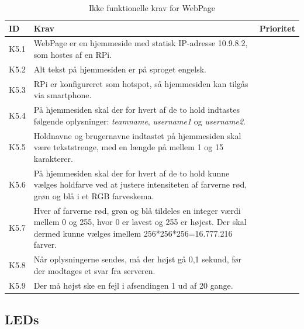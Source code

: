 \documentclass[Kravspecifikation/Kravspec_Main.tex]{subfiles}
\begin{document}
\begin{table}[H]
\begin{tabular}{|L{0.1\textwidth}|L{0.75\textwidth}|L{0.15\textwidth}|}
\hline
\textbf{ID} & \textbf{Krav} & \textbf{Prioritet} \\ \hline
K5.1 & WebPage er en hjemmeside med statisk IP-adresse 10.9.8.2, som hostes af en RPi. & \\ \hline
K5.2 & Alt tekst på hjemmesiden er på sproget engelsk. & \\ \hline
K5.3 & RPi er konfigureret som hotspot, så hjemmesiden kan tilgås via smartphone. & \\ \hline
K5.4 & På hjemmesiden skal der for hvert af de to hold indtastes følgende oplysninger: \textit{teamname}, \textit{username1} og \textit{username2}. & \\ \hline
K5.5 & Holdnavne og brugernavne indtastet på hjemmesiden skal være tekststrenge, med en længde på mellem 1 og 15 karakterer. & \\ \hline
K5.6 & På hjemmesiden skal der for hvert af de to hold kunne vælges holdfarve ved at justere intensiteten af farverne rød, grøn og blå i et RGB farveskema. & \\ \hline
K5.7 & Hver af farverne rød, grøn og blå tildeles en integer værdi mellem 0 og 255, hvor 0 er lavest og 255 er højest. Der skal dermed kunne vælges imellem 256*256*256=16.777.216 farver.  & \\ \hline
K5.8 & Når oplysningerne sendes, må der højst gå 0,1 sekund, før der modtages et svar fra serveren. & \\ \hline
K5.9 & Der må højst ske en fejl i afsendingen 1 ud af 20 gange. & \\ \hline
\end{tabular}
\caption{Ikke funktionelle krav for WebPage}
\label{tab:WebPage}
\end{table}

\subsection{LEDs}
\end{document}
